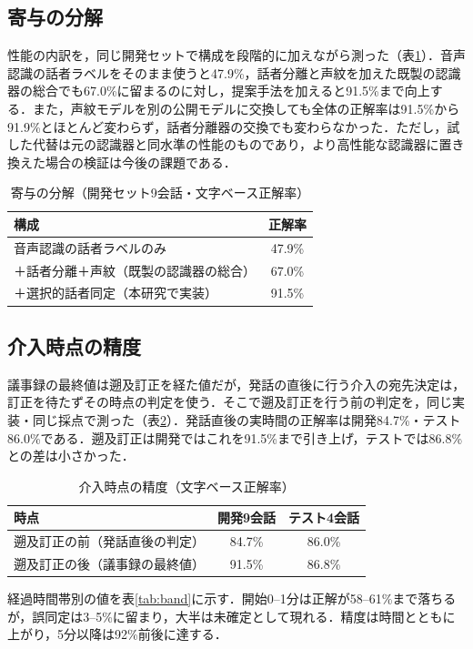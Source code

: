 \documentclass[a4paper]{ltjsarticle}
\begin{document}
\subsection{寄与の分解}
性能の内訳を，同じ開発セットで構成を段階的に加えながら測った（表\ref{tab:decomp}）．音声認識の話者ラベルをそのまま使うと47.9\%，話者分離と声紋を加えた既製の認識器の総合でも67.0\%に留まるのに対し，提案手法を加えると91.5\%まで向上する．また，声紋モデルを別の公開モデルに交換しても全体の正解率は91.5\%から91.9\%とほとんど変わらず，話者分離器の交換でも変わらなかった．ただし，試した代替は元の認識器と同水準の性能のものであり，より高性能な認識器に置き換えた場合の検証は今後の課題である．

\begin{table}[tb]
\centering
\caption{寄与の分解（開発セット9会話・文字ベース正解率）}
\label{tab:decomp}
\small
\begin{tabular}{lc}
\toprule
構成 & 正解率 \\
\midrule
音声認識の話者ラベルのみ & 47.9\% \\
＋話者分離＋声紋（既製の認識器の総合） & 67.0\% \\
＋選択的話者同定（本研究で実装） & 91.5\% \\
\bottomrule
\end{tabular}
\end{table}

\subsection{介入時点の精度}
議事録の最終値は遡及訂正を経た値だが，発話の直後に行う介入の宛先決定は，訂正を待たずその時点の判定を使う．そこで遡及訂正を行う前の判定を，同じ実装・同じ採点で測った（表\ref{tab:now}）．発話直後の実時間の正解率は開発84.7\%・テスト86.0\%である．遡及訂正は開発ではこれを91.5\%まで引き上げ，テストでは86.8\%との差は小さかった．

\begin{table}[tb]
\centering
\caption{介入時点の精度（文字ベース正解率）}
\label{tab:now}
\small
\begin{tabular}{lcc}
\toprule
時点 & 開発9会話 & テスト4会話 \\
\midrule
遡及訂正の前（発話直後の判定） & 84.7\% & 86.0\% \\
遡及訂正の後（議事録の最終値） & 91.5\% & 86.8\% \\
\bottomrule
\end{tabular}
\end{table}
経過時間帯別の値を表\ref{tab:band}に示す．開始0--1分は正解が58--61\%まで落ちるが，誤同定は3--5\%に留まり，大半は未確定として現れる．精度は時間とともに上がり，5分以降は92\%前後に達する．
\end{document}

